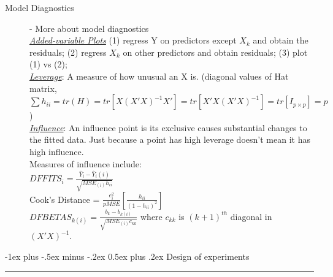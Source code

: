\documentclass[10pt,landscape]{article}
\makeatletter
\renewcommand{\section}{\@startsection{section}{1}{0mm}%
                                {-1ex plus -.5ex minus -.2ex}%
                                {0.5ex plus .2ex}%
                                {\normalfont\large\bfseries}}
\makeatother
\begin{document}
\begin{multicols}{3}
    
\begin{description}
	\item[Model Diagnostics] - More about model diagnostics\\
	\underline{\textit{Added-variable Plots}} (1) regress Y on predictors except $X_k$ and obtain the residuals; (2) regress $X_k$ on other predictors and obtain residuals; (3) plot (1) vs (2);\\
	\underline{\textit{Leverage}}: A measure of how unusual an X is. (diagonal values of Hat matrix, $\sum h_{ii} = tr(H) = tr[X(X'X)^{-1}X'] = tr[X'X(X'X)^{-1}] = tr[I_{p\times p}] = p$) \\
	\underline{\textit{Influence}}: An influence point is its exclusive causes substantial changes to the fitted data. Just because a point has high leverage doesn't mean it has high influence. \\
	Measures of influence include: \\
	$DFFITS_i = \frac{\hat{Y}_i - \hat{Y}_i(i)}{\sqrt{MSE_{(i)}h_{ii}}}$ \\
	Cook's Distance = $\frac{e_i^2}{pMSE}[\frac{h_{ii}}{(1-h_{ii})^2}]$ \\
	$DFBETAS_{k(i)} = \frac{b_k - b_{k(i)}}{\sqrt{MSE_{(i)}c_{kk}}}$ where $c_{kk}$ is  $(k+1)^{th}$ diagonal in $(X'X)^{-1}$.
	
\end{description}
    

\section{Design of experiments} \smallskip \hrule height 2pt \smallskip


\end{multicols}
\end{document}
